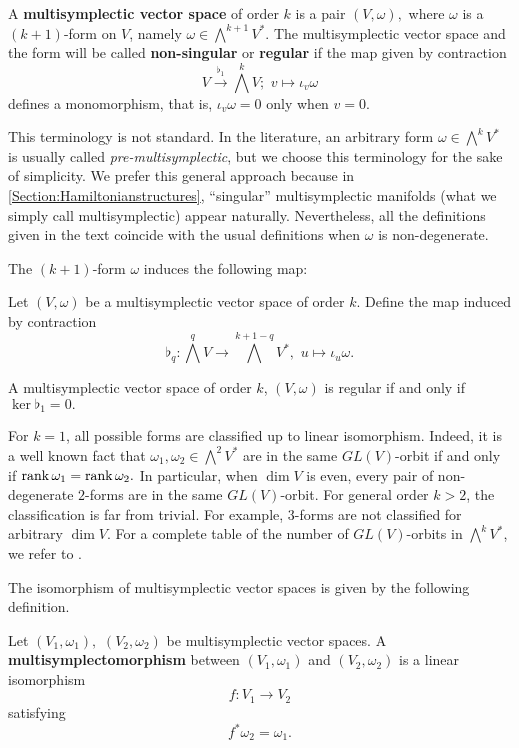\begin{Def} A \textbf{multisymplectic vector space} of order $k$ is a pair $(V, \omega),$ where $\omega$ is a $(k+1)$-form on $V$, namely $\omega \in \bigwedge^{k+1} V^\ast.$ The multisymplectic vector space and the form will be called \textbf{non-singular} or \textbf{regular} if the map given by contraction $$V \xrightarrow{\flat_1} \bigwedge^k V; \,\, v \mapsto \iota_v \omega$$ defines a monomorphism, that is, $\iota_v \omega = 0$ only when $v = 0.$
\end{Def}
\begin{obs} This terminology is not standard. In the literature, an arbitrary form $\omega \in \bigwedge^k V^\ast$ is usually called \textit{pre-multisymplectic}, but we choose this terminology for the sake of simplicity. We prefer this general approach because in \cref{Section:Hamiltonianstructures}, ``singular'' multisymplectic manifolds (what we simply call multisymplectic) appear naturally. Nevertheless, all the definitions given in the text coincide with the usual definitions when $\omega$ is non-degenerate. 
\end{obs}
The $(k +1)$-form $\omega$ induces the following map:
\begin{Def} Let $(V, \omega)$ be a multisymplectic vector space of order $k$. Define the map induced by contraction $$\flat_q : \bigwedge^{q} V \rightarrow \bigwedge^{k + 1 - q} V^\ast, \,\, u \mapsto \iota_u \omega.$$
\end{Def}
\begin{remark} A multisymplectic vector space of order $k$, $(V, \omega)$ is regular if and only if $\ker \flat_1 = 0.$
\end{remark}

\begin{obs} For $k = 1$, all possible forms are classified up to linear isomorphism. Indeed, it is a well known fact that $\omega_1, \omega_2 \in \bigwedge^2 V^\ast$ are in the same $GL(V)$-orbit if and only if $\rank \omega_1 = \rank \omega_2.$ In particular, when $\dim V$ is even, every pair of non-degenerate $2$-forms are in the same $GL(V)$-orbit. For general order $k > 2$, the classification is far from trivial. For example, $3$-forms are not classified for arbitrary $\dim V$. For a complete table of the number of $GL(V)$-orbits in $\bigwedge^k V^\ast$, we refer to \cite{orbitsforms}. 
\end{obs}
The isomorphism of multisymplectic vector spaces is given by the following definition.
\begin{Def}[Multisymplectomorphism] Let $(V_1, \omega_1),$ $(V_2, \omega_2)$ be multisymplectic vector spaces. A \textbf{multisymplectomorphism} between $(V_1, \omega_1)$ and $(V_2, \omega_2)$ is a linear isomorphism $$f: V_1 \rightarrow V_2$$ satisfying $$f^\ast \omega_2 = \omega_1.$$ 
\end{Def}

